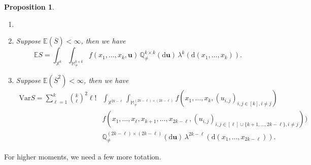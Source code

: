 \documentclass{article}
\newtheorem{prop}[theorem]{Proposition}
\theoremstyle{definition}
\numberwithin{equation}{section}
\theoremstyle{remark}
\newcommand{\E}{\mathbb{E}}
\newcommand{\Var}{\mathrm{Var}}
\begin{document}
\begin{prop}\label{prop:expectation_variance}
    \begin{enumerate}
    \item[]
    \item[a)]
    Suppose $\E(\overline{S})<\infty$, then we have 
\begin{equation}\label{eqn:generalised_Mecke_U-statistics}
\E S = \int_{\mathbb{X}^k}\int_{\mathbb{M}^{k\times k}_{\neq}} f(x_1,\ldots,x_k,\mathbf{u}) \, \mathbb{Q}_{\neq}^{k\times k}(\mathrm{d}\mathbf{u}) \, \lambda^k(\mathrm{d}(x_1,\ldots,x_k)).
\end{equation}
\item[b)] Suppose $\E\left(\overline{S}^2\right)<\infty$, then we have 
\begin{align}\label{eqn:variance}
\Var S =\sum_{\ell=1}^k{k\choose \ell}^2\ell! &\int_{\mathbb{X}^{2k-\ell}}\int_{\mathbb{M}^{(2k-\ell)\times (2k-\ell)}_{\neq}} f(x_1,\ldots,x_k,(u_{i,j})_{i,j\in[k],i\ne j}) \nonumber\\
&f(x_1,\dots,x_{\ell},x_{k+1},\dots,x_{2k-\ell},(u_{i,j})_{i,j\in[\ell]\cup\{k+1,\dots,2k-\ell\},i\ne j}) )\\
&\mathbb{Q}_{\neq}^{(2k-\ell)\times (2k-\ell)}(\mathrm{d}\mathbf{u}) \, \lambda^{2k-\ell}(\mathrm{d}(x_1,\ldots,x_{2k-\ell})).\nonumber
\end{align}
\end{enumerate}
\end{prop}

For higher moments, we need a few more totation.
\end{document}
